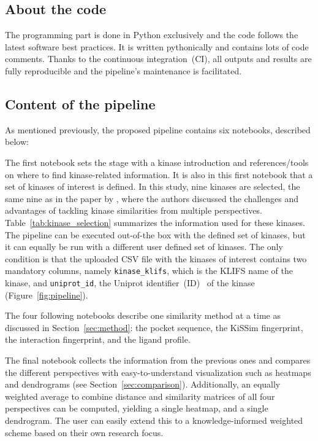 \documentclass[9pt,training]{livecoms}
\begin{document}
\subsection{About the code}
The programming part is done in Python exclusively and the code follows the latest software best practices. It is written pythonically and contains lots of code comments.
Thanks to the continuous integration~(CI), all outputs and results are fully reproducible and the pipeline's maintenance is facilitated.

\subsection{Content of the pipeline}
As mentioned previously, the proposed pipeline contains six notebooks, described below:

The first notebook sets the stage with a kinase introduction and references/tools on where to find kinase-related information. It is also in this first notebook that a set of kinases of interest is defined. In this study, nine kinases are selected, the same nine as in the paper by \citet{Schmidt_2021_molecules}, where the authors discussed the challenges and advantages of tackling kinase similarities from multiple perspectives. Table~\ref{tab:kinase_selection} summarizes the information used for these kinases.
The pipeline can be executed out-of-the box with the defined set of kinases, but it can equally be run with a different user defined set of kinases. The only condition is that the uploaded CSV file with the kinases of interest contains two mandatory columns, namely \texttt{kinase\_klifs}, which is the KLIFS name of the kinase, and \texttt{uniprot\_id}, the Uniprot identifier~(ID)~\cite{uniprot_consortium_2020_nar} of the kinase (Figure~\ref{fig:pipeline}).

The four following notebooks describe one similarity method at a time as discussed in Section~\ref{sec:method}: the pocket sequence, the KiSSim fingerprint, the interaction fingerprint, and the ligand profile.

The final notebook collects the information from the previous ones and compares the different perspectives with easy-to-understand visualization such as heatmaps and dendrograms (see Section~\ref{sec:comparison}). Additionally, an equally weighted average to combine distance and similarity matrices of all four perspectives can be computed, yielding a single heatmap, and a single dendrogram. The user can easily extend this to a knowledge-informed weighted scheme based on their own research focus.
\end{document}
